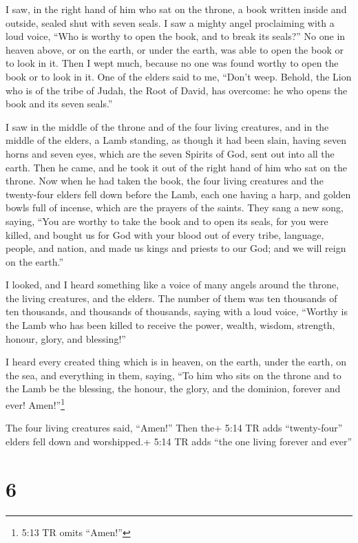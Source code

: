  I saw, in the right hand of him who sat on the throne, a
book written inside and outside, sealed shut with seven seals.
 I saw a mighty angel proclaiming with a loud voice, ``Who
is worthy to open the book, and to break its seals?''  No
one in heaven above, or on the earth, or under the earth, was able to
open the book or to look in it.  Then I wept much, because
no one was found worthy to open the book or to look in it. 
One of the elders said to me, ``Don't weep. Behold, the Lion who is of
the tribe of Judah, the Root of David, has overcome: he who opens the
book and its seven seals.''

 I saw in the middle of the throne and of the four living
creatures, and in the middle of the elders, a Lamb standing, as though
it had been slain, having seven horns and seven eyes, which are the
seven Spirits of God, sent out into all the earth.  Then he
came, and he took it out of the right hand of him who sat on the throne.
 Now when he had taken the book, the four living creatures
and the twenty-four elders fell down before the Lamb, each one having a
harp, and golden bowls full of incense, which are the prayers of the
saints.  They sang a new song, saying, ``You are worthy to
take the book and to open its seals, for you were killed, and bought us
for God with your blood out of every tribe, language, people, and
nation,  and made us kings and priests to our God; and we
will reign on the earth.''

 I looked, and I heard something like a voice of many
angels around the throne, the living creatures, and the elders. The
number of them was ten thousands of ten thousands, and thousands of
thousands,  saying with a loud voice, ``Worthy is the Lamb
who has been killed to receive the power, wealth, wisdom, strength,
honour, glory, and blessing!''

 I heard every created thing which is in heaven, on the
earth, under the earth, on the sea, and everything in them, saying, ``To
him who sits on the throne and to the Lamb be the blessing, the honour,
the glory, and the dominion, forever and ever! Amen!''\footnote{5:13 TR
  omits ``Amen!''}

 The four living creatures said, ``Amen!'' Then the+ 5:14
TR adds ``twenty-four'' elders fell down and worshipped.+ 5:14 TR adds
``the one living forever and ever''

\hypertarget{section-5}{%
\section{6}\label{section-5}}

